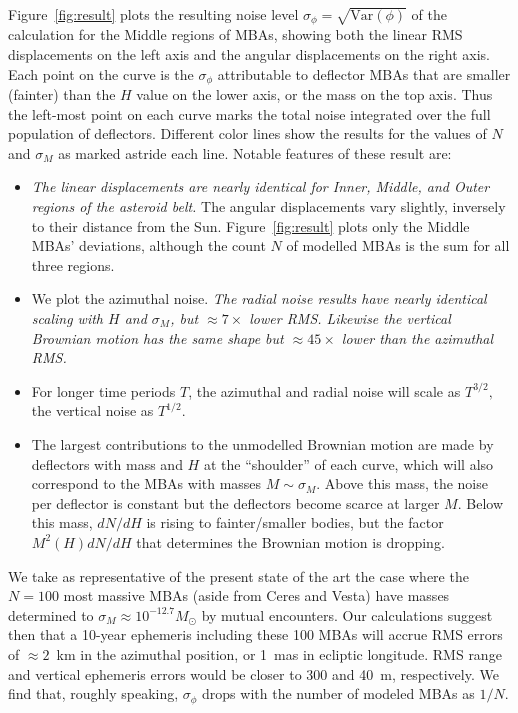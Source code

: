 \documentclass[linenumbers, onecolumn]{aastex631}
\newcommand{\Var}{\textrm{Var}}
\begin{document}
Figure~\ref{fig:result} plots the resulting noise level $\sigma_\phi=\sqrt{\Var(\phi)}$ of the calculation for the Middle regions of MBAs, showing both the linear RMS displacements on the left axis and the angular displacements on the right axis.  Each point on the curve is the $\sigma_\phi$ attributable to deflector MBAs that are smaller (fainter) than the $H$ value on the lower axis, or the mass on the top axis.  Thus the left-most point on each curve marks the total noise integrated over the full population of deflectors. Different color lines show the results for the values of $N$ and $\sigma_M$ as marked astride each line.  Notable features of these result are:
\begin{itemize}
\item \emph{The linear displacements are nearly identical for Inner,
    Middle, and Outer regions of the asteroid belt.}  The angular
  displacements vary slightly, inversely to their distance from the
  Sun.  Figure~\ref{fig:result} plots only the Middle MBAs'
  deviations, although the count $N$ of modelled MBAs is the sum for
  all three regions.
\item We plot the azimuthal noise.  \emph{The radial noise results
    have nearly identical scaling with $H$ and $\sigma_M$, but
    $\approx 7\times$ lower RMS. Likewise the vertical Brownian motion
    has the same shape but $\approx45\times$ lower than the azimuthal RMS.}
\item For longer time periods $T$, the azimuthal and radial noise will scale as
$T^{3/2},$ the vertical
noise as $T^{1/2}.$
\item The largest contributions to the unmodelled Brownian motion are
made by deflectors with mass and $H$ at the ``shoulder'' of each
curve, which will also correspond to the MBAs with masses $M\sim
\sigma_M$.  Above this mass, the noise per deflector is constant but
the deflectors become scarce at larger $M.$ Below this mass, $dN/dH$
is rising to fainter/smaller bodies, but the factor $M^2(H) dN/dH$
that determines the Brownian motion is dropping.
\end{itemize}

We take as representative of the present state of the art the case
where the $N=100$ most massive MBAs (aside from Ceres and Vesta) have
masses determined to $\sigma_M\approx 10^{-12.7} M_\odot$ by mutual
encounters.  Our calculations suggest then that a 10-year ephemeris
including these 100 MBAs will accrue RMS errors of $\approx 2$~km in
the azimuthal position, or 1~mas in ecliptic longitude.
RMS range and vertical ephemeris errors would be closer to 300 and 40~m, respectively.  We find that, roughly speaking, $\sigma_\phi$
drops with the number of modeled MBAs as $1/N.$
\end{document}
